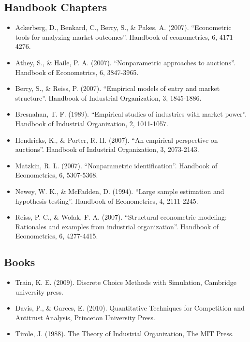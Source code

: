 \documentclass[]{book}
\providecommand{\tightlist}{%
  \setlength{\itemsep}{0pt}\setlength{\parskip}{0pt}}
\begin{document}
\subsection{Handbook Chapters}\label{handbook-chapters}

\begin{itemize}
\tightlist
\item
  Ackerberg, D., Benkard, C., Berry, S., \& Pakes, A. (2007).
  ``Econometric tools for analyzing market outcomes''. Handbook of
  econometrics, 6, 4171-4276.
\item
  Athey, S., \& Haile, P. A. (2007). ``Nonparametric approaches to
  auctions''. Handbook of Econometrics, 6, 3847-3965.
\item
  Berry, S., \& Reiss, P. (2007). ``Empirical models of entry and market
  structure''. Handbook of Industrial Organization, 3, 1845-1886.
\item
  Bresnahan, T. F. (1989). ``Empirical studies of industries with market
  power''. Handbook of Industrial Organization, 2, 1011-1057.
\item
  Hendricks, K., \& Porter, R. H. (2007). ``An empirical perspective on
  auctions''. Handbook of Industrial Organization, 3, 2073-2143.
\item
  Matzkin, R. L. (2007). ``Nonparametric identification''. Handbook of
  Econometrics, 6, 5307-5368.
\item
  Newey, W. K., \& McFadden, D. (1994). ``Large sample estimation and
  hypothesis testing''. Handbook of Econometrics, 4, 2111-2245.
\item
  Reiss, P. C., \& Wolak, F. A. (2007). ``Structural econometric
  modeling: Rationales and examples from industrial organization''.
  Handbook of Econometrics, 6, 4277-4415.
\end{itemize}

\subsection{Books}\label{books}

\begin{itemize}
\tightlist
\item
  Train, K. E. (2009). Discrete Choice Methods with Simulation,
  Cambridge university press.
\item
  Davis, P., \& Garces, E. (2010). Quantitative Techniques for
  Competition and Antitrust Analysis, Princeton University Press.
\item
  Tirole, J. (1988). The Theory of Industrial Organization, The MIT
  Press.
\end{itemize}
\end{document}
